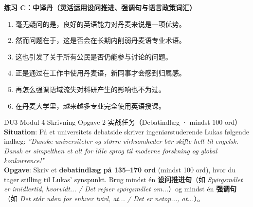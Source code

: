 \textbf{练习 C：中译丹（灵活运用设问推进、强调句与语言政策词汇）}
\begin{enumerate}
  \item 毫无疑问的是，良好的英语能力对丹麦来说是一项优势。
  \item 然而问题在于，这是否会在长期内削弱丹麦语专业术语。
  \item 这也引发了关于所有公民是否仍能参与讨论的问题。
  \item 正是通过在工作中使用丹麦语，新同事才会感到归属感。
  \item 再怎么强调语域流失对科研产生的影响也不为过。
  \item 在丹麦大学里，越来越多专业完全使用英语授课。
\end{enumerate}


\begin{emailbox}{DU3 Modul 4 Skrivning Opgave 2 实战任务（Debatindlæg · mindst 100 ord）}
\textbf{Situation}: På et universitets debatside skriver ingeniørstuderende Lukas følgende indlæg:\newline
\textit{”Danske universiteter og større virksomheder bør skifte helt til engelsk. Dansk er simpelthen et alt for lille sprog til moderne forskning og global konkurrence!”}\\[3pt]
\textbf{Opgave}: Skriv et \textbf{debatindlæg på 135--170 ord} (mindst 100 ord), hvor du tager stilling til Lukas' synspunkt. Brug mindst én \textbf{设问推进句}（如 \textit{Spørgsmålet er imidlertid, hvorvidt... / Det rejser spørgsmålet om...}）og mindst én \textbf{强调句}（如 \textit{Det står uden for enhver tvivl, at... / Det er netop..., at...}）。
\end{emailbox}

